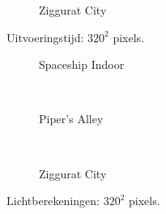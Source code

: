 \begin{figure}[t]
\begin{minipage}[t]{0.5\textwidth}
  \begin{adjustbox}{minipage=\textwidth, scale=0.55}
    \begin{subfigure}[b]{1.6\textwidth}
      \centering
      \def\svgwidth{\textwidth}
      
      \caption{Ziggurat City}
      \label{fig:hs-ns-frame-low:exec:city}
    \end{subfigure}
  \end{adjustbox}
  \caption{\small Uitvoeringstijd: $320^2$ pixels.}
  \label{fig:hs-ns-frame-low:exec}
  \end{minipage}%
  \begin{minipage}[t]{0.5\textwidth}
  \begin{adjustbox}{minipage=\textwidth, scale=0.55}
    \begin{subfigure}[b]{1.6\textwidth}
      \centering
      \def\svgwidth{\textwidth}
      
      \caption{Spaceship Indoor}
      \vspace{4pt}
      \label{fig:hs-ns-frame-low:lc:indoor}
    \end{subfigure}
  \end{adjustbox} \\
  \begin{adjustbox}{minipage=\textwidth, scale=0.55}
    \begin{subfigure}[b]{1.6\textwidth}
      \centering
      \def\svgwidth{\textwidth}
      
      \caption{Piper's Alley}
      \vspace{4pt}
      \label{fig:hs-ns-frame-low:lc:alley}
    \end{subfigure}
  \end{adjustbox} \\
  \begin{adjustbox}{minipage=\textwidth, scale=0.55}
    \begin{subfigure}[b]{1.6\textwidth}
      \centering
      \def\svgwidth{\textwidth}
      
      \caption{Ziggurat City}
      \label{fig:hs-ns-frame-low:lc:city}
    \end{subfigure}
  \end{adjustbox}
  \caption{\small Lichtberekeningen: $320^2$ pixels.}
  \label{fig:hs-ns-frame-low:lc}
  \end{minipage} 
\end{figure}

